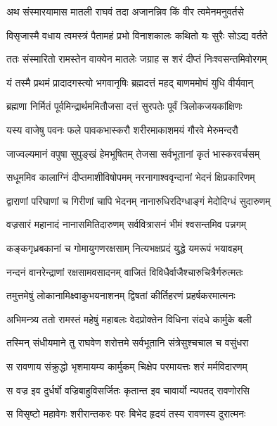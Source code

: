 
\twolineshloka
{अथ संस्मारयामास मातली राघवं तदा}
{अजानन्निव किं वीर त्वमेनमनुवर्तसे} %

\twolineshloka
{विसृजास्मै वधाय त्वमस्त्रं पैतामहं प्रभो}
{विनाशकालः कथितो यः सुरैः सोऽद्य वर्तते} %

\twolineshloka
{ततः संस्मारितो रामस्तेन वाक्येन मातलेः}
{जग्राह स शरं दीप्तं निःश्वसन्तमिवोरगम्} %

\twolineshloka
{यं तस्मै प्रथमं प्रादादगस्त्यो भगवानृषिः}
{ब्रह्मदत्तं महद् बाणममोघं युधि वीर्यवान्} %

\twolineshloka
{ब्रह्मणा निर्मितं पूर्वमिन्द्रार्थममितौजसा}
{दत्तं सुरपतेः पूर्वं त्रिलोकजयकांक्षिणः} %

\twolineshloka
{यस्य वाजेषु पवनः फले पावकभास्करौ}
{शरीरमाकाशमयं गौरवे मेरुमन्दरौ} %

\twolineshloka
{जाज्वल्यमानं वपुषा सुपुङ्खं हेमभूषितम्}
{तेजसा सर्वभूतानां कृतं भास्करवर्चसम्} %

\twolineshloka
{सधूममिव कालाग्निं दीप्तमाशीविषोपमम्}
{नरनागाश्ववृन्दानां भेदनं क्षिप्रकारिणम्} %

\twolineshloka
{द्वाराणां परिघाणां च गिरीणां चापि भेदनम्}
{नानारुधिरदिग्धाङ्गं मेदोदिग्धं सुदारुणम्} %

\twolineshloka
{वज्रसारं महानादं नानासमितिदारुणम्}
{सर्ववित्रासनं भीमं श्वसन्तमिव पन्नगम्} %

\twolineshloka
{कङ्कगृध्रबकानां च गोमायुगणरक्षसाम्}
{नित्यभक्षप्रदं युद्धे यमरूपं भयावहम्} %

\twolineshloka
{नन्दनं वानरेन्द्राणां रक्षसामवसादनम्}
{वाजितं विविधैर्वाजैश्चारुचित्रैर्गरुत्मतः} %

\twolineshloka
{तमुत्तमेषुं लोकानामिक्ष्वाकुभयनाशनम्}
{द्विषतां कीर्तिहरणं प्रहर्षकरमात्मनः} %

\twolineshloka
{अभिमन्त्र्य ततो रामस्तं महेषुं महाबलः}
{वेदप्रोक्तेन विधिना संदधे कार्मुके बली} %

\twolineshloka
{तस्मिन् संधीयमाने तु राघवेण शरोत्तमे}
{सर्वभूतानि संत्रेसुश्चचाल च वसुंधरा} %

\twolineshloka
{स रावणाय संक्रुद्धो भृशमायम्य कार्मुकम्}
{चिक्षेप परमायत्तः शरं मर्मविदारणम्} %

\twolineshloka
{स वज्र इव दुर्धर्षो वज्रिबाहुविसर्जितः}
{कृतान्त इव चावार्यो न्यपतद् रावणोरसि} %

\twolineshloka
{स विसृष्टो महावेगः शरीरान्तकरः परः}
{बिभेद हृदयं तस्य रावणस्य दुरात्मनः} %


